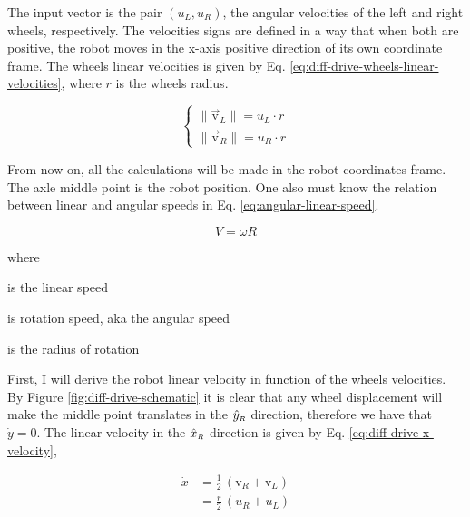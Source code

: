 \documentclass[12pt]{article}
\begin{document}
 The input vector is the pair $(u_L, u_R)$, the angular velocities of the left and right wheels, respectively. The velocities signs are defined in a way that when both are positive, the robot moves in the x-axis positive direction of its own coordinate frame. The wheels linear velocities is given by Eq. \ref{eq:diff-drive-wheels-linear-velocities}, where $r$ is the wheels radius.

 \begin{equation}
 \begin{cases}
     \lVert \vec{\mathrm{v}}_L \rVert = u_L \cdot r\\
     \lVert \vec{\mathrm{v}}_R \rVert = u_R \cdot r
 \end{cases}
     \label{eq:diff-drive-wheels-linear-velocities}
 \end{equation}

 From now on, all the calculations will be made in the robot coordinates frame. The axle middle point is the robot position. One also must know the relation between linear and angular speeds in Eq. \ref{eq:angular-linear-speed}.

 \begin{equation}
     V = \omega R
     \label{eq:angular-linear-speed}
 \end{equation}

 \noindent where
 \begin{description}[labelindent=10pt, labelsep=10pt]
     \item[$V$] is the linear speed
     \item[$\omega$] is rotation speed, aka the angular speed
     \item[$R$] is the radius of rotation
 \end{description}

 First, I will derive the robot linear velocity in function of the wheels velocities. By Figure \ref{fig:diff-drive-schematic} it is clear that any wheel displacement will make the middle point translates in the $\hat{y}_\mathsmaller{R}$ direction, therefore we have that $\dot{y} = 0$. The linear velocity in the $\hat{x}_\mathsmaller{R}$ direction is given by Eq. \ref{eq:diff-drive-x-velocity},

 \begin{equation}
 \begin{aligned}
     \dot{x} &= \frac{1}{2} \,(\mathrm{v}_R + \mathrm{v}_L)\\
     &= \frac{r}{2} \,(u_R + u_L)
 \end{aligned}
     \label{eq:diff-drive-x-velocity}
 \end{equation}
\end{document}
